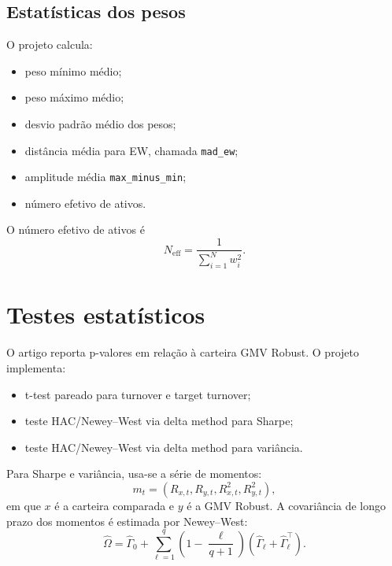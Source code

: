 \documentclass[12pt,a4paper]{article}
\begin{document}
\subsection{Estatísticas dos pesos}

O projeto calcula:
\begin{itemize}[leftmargin=*]
  \item peso mínimo médio;
  \item peso máximo médio;
  \item desvio padrão médio dos pesos;
  \item distância média para EW, chamada \texttt{mad\_ew};
  \item amplitude média \texttt{max\_minus\_min};
  \item número efetivo de ativos.
\end{itemize}

O número efetivo de ativos é
\begin{equation}
  N_{\mathrm{eff}}
  =
  \frac{1}{\sum_{i=1}^{N}w_i^2}.
\end{equation}

\section{Testes estatísticos}

O artigo reporta p-valores em relação à carteira GMV Robust. O projeto implementa:

\begin{itemize}[leftmargin=*]
  \item t-test pareado para turnover e target turnover;
  \item teste HAC/Newey--West via delta method para Sharpe;
  \item teste HAC/Newey--West via delta method para variância.
\end{itemize}

Para Sharpe e variância, usa-se a série de momentos:
\begin{equation}
  m_t = (R_{x,t}, R_{y,t}, R_{x,t}^2, R_{y,t}^2),
\end{equation}
em que $x$ é a carteira comparada e $y$ é a GMV Robust. A covariância de longo prazo dos
momentos é estimada por Newey--West:
\begin{equation}
  \widehat\Omega
  =
  \widehat\Gamma_0
  +
  \sum_{\ell=1}^{q}
  \left(1-\frac{\ell}{q+1}\right)
  \left(
    \widehat\Gamma_\ell
    +
    \widehat\Gamma_\ell^\top
  \right).
\end{equation}
\end{document}
